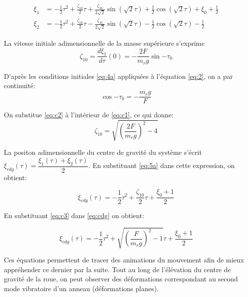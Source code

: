 \begin{align}
    \xi_1&=-\frac{1}{2}\tau^2+\frac{\zeta_{10}}{2}\tau+\frac{\zeta_{10}}{2\sqrt{2}}\sin{(\sqrt{2}\tau)}+\frac{1}{2}\cos{(\sqrt{2}\tau)}+\xi_0+\frac{1}{2} \nonumber\\
    \xi_2&=-\frac{1}{2}\tau^2+\frac{\zeta_{10}}{2}\tau-\frac{\zeta_{10}}{2\sqrt{2}}\sin{(\sqrt{2}\tau)}-\frac{1}{2}\cos{(\sqrt{2}\tau)}-\frac{1}{2}
  \label{eq:5a}
\end{align}

La vitesse initiale adimensionnelle de la masse supérieure s'exprime
\begin{equation}
    \zeta_{10}=\frac{d\xi_1}{d\tau}(0)=-\frac{2F}{m_r g}\sin{-\tau_0}
    \label{eq:c1}
\end{equation}


D'après les conditions initiales \ref{eq:4a} appliquées à l'équation \ref{eq:2}, on a par continuité:
\begin{equation}
    \cos{-\tau_0}=-\frac{m_r g}{F}
    \label{eq:c2}
\end{equation}

On substitue \ref{eq:c2} à l'intérieur de \ref{eq:c1}, ce qui donne:
\begin{equation}
    \zeta_{10}=\sqrt{(\frac{2F}{m_r g})^2-4}
    \label{eq:c3}
\end{equation}

La positon adimensionnelle du centre de gravité du système s'écrit $\xi_{cdg}(\tau)=\dfrac{\xi_1(\tau)+\xi_2(\tau)}{2}$. En substituant \ref{eq:5a} dans cette expression, on obtient: 

\begin{equation}
  \xi_{cdg}(\tau)=-\frac{1}{2}\tau^2+\frac{\zeta_{10}}{2}\tau+\frac{\xi_0+1}{2}
  \label{eq:cdg}
\end{equation}

En substituant \ref{eq:c3} dans \ref{eq:cdg} on obtient:

\begin{equation}
  \xi_{cdg}(\tau)=-\frac{1}{2}\tau^2+\sqrt{(\frac{F}{m_r g})^2-1}\tau+\frac{\xi_0+1}{2}
  \label{eq:cdg2}
\end{equation}



Ces équations permettent de tracer des animations du mouvement afin de mieux appréhender ce dernier par la suite. Tout au long de l'élévation du centre de gravité de la roue, on peut observer des déformations correspondant au second mode vibratoire d'un anneau (déformations planes).
\\ 
\\


